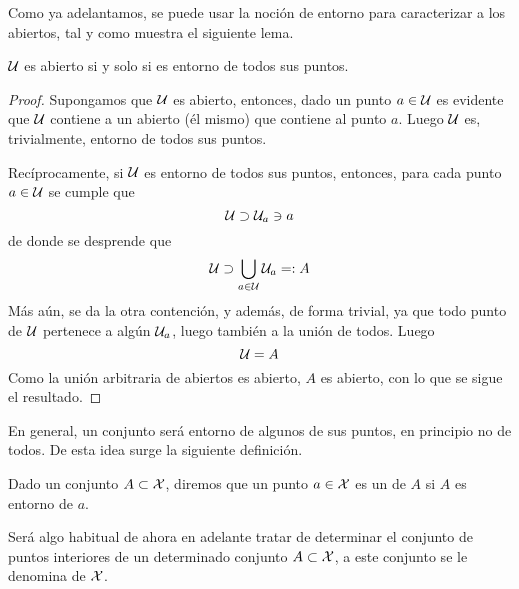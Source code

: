 Como ya adelantamos, se puede usar la noción de entorno para caracterizar a los abiertos, tal y como muestra el siguiente lema.
\begin{lem}
	\label{etop_lem_caracterizacionAbiertos}
	$\mathcal{U}$ es abierto si y solo si es entorno de todos sus puntos.
\end{lem}
\begin{proof}
	Supongamos que $\mathcal{U}$ es abierto, entonces, dado un punto $a\in\mathcal{U}$ es evidente que $\mathcal{U}$ contiene a un abierto (él mismo) que contiene al punto $a$. Luego $\mathcal{U}$ es, trivialmente, entorno de todos sus puntos.
	
	Recíprocamente, si $\mathcal{U}$ es entorno de todos sus puntos, entonces, para cada punto $a\in\mathcal{U}$ se cumple que
	\begin{equation*}
	\mathcal{U}\supset\mathcal{U}_a\ni a
	\end{equation*}
	de donde se desprende que
	\begin{equation*}
	\mathcal{U}\supset\bigcup_{a\in\mathcal{U}}\mathcal{U}_a=:A
	\end{equation*}
	Más aún, se da la otra contención, y además, de forma trivial, ya que todo punto de $\mathcal{U}$ pertenece a algún $\mathcal{U}_a$, luego también a la unión de todos. Luego
	\begin{equation*}
	\mathcal{U}=A
	\end{equation*}
	Como la unión arbitraria de abiertos es abierto, $A$ es abierto, con lo que se sigue el resultado.
\end{proof}
En general, un conjunto será entorno de algunos de sus puntos, en principio no de todos. De esta idea surge la siguiente definición.
\begin{defi}
	\label{etop_def_puntoInterior}
	Dado un conjunto $A\subset\mathcal{X}$, diremos que un punto $a\in\mathcal{X}$ es un  de $A$ si $A$ es entorno de $a$.
\end{defi}
Será algo habitual de ahora en adelante tratar de determinar el conjunto de puntos interiores de un determinado conjunto $A\subset\mathcal{X}$, a este conjunto se le denomina  de $\mathcal{X}$.

